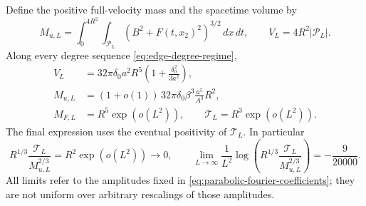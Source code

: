 \begin{proposition}
\label{prop:full-velocity-mass}
Define the positive full-velocity mass and the spacetime volume by
\[
 M_{u,L}=\int_0^{4R^2}\int_{\mathcal P_L}
                  (B^2+F(t,x_2)^2)^{3/2}\,dx\,dt,
 \qquad V_L=4R^2|\mathcal P_L|.
\]
Along every degree sequence \eqref{eq:edge-degree-regime},
\begin{align}
 V_L&=32\pi\delta_0a^2R^5
                   \left(1+\frac{\delta_0^2}{3a^2}\right),
                   \label{eq:complete-volume}\\
 M_{u,L}&=(1+o(1))\,32\pi\delta_0\beta^3
                       \frac{a^5}{A^3}R^2,\label{eq:complete-mass}\\
 M_{F,L}&=R^5\exp(o(L^2)),\qquad
 \mathcal T_L=R^3\exp(o(L^2)).\label{eq:component-scales}
\end{align}
The final expression uses the eventual positivity of $\mathcal T_L$.
In particular
\begin{equation}\label{eq:complete-velocity-rate}
 R^{1/3}\frac{\mathcal T_L}{M_{u,L}^{2/3}}
   =R^2\exp(o(L^2))\longrightarrow0,
 \qquad
 \lim_{L\to\infty}\frac1{L^2}
 \log\left(R^{1/3}\frac{\mathcal T_L}{M_{u,L}^{2/3}}\right)
   =-\frac9{20000}.
\end{equation}
All limits refer to the amplitudes fixed in
\eqref{eq:parabolic-fourier-coefficients}; they are not uniform over
arbitrary rescalings of those amplitudes.
\end{proposition}
